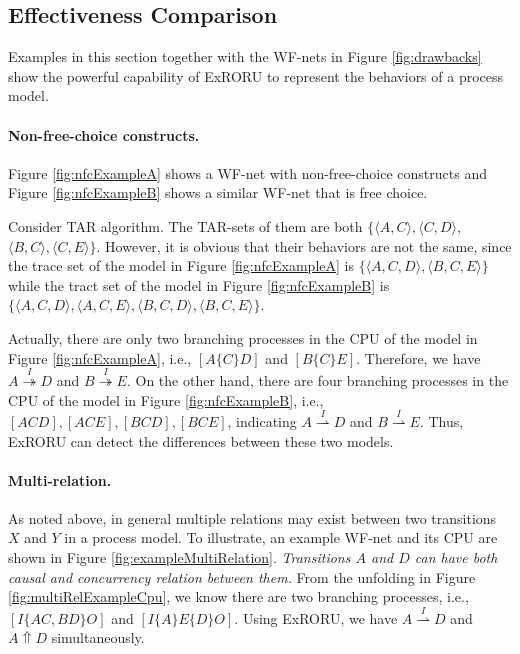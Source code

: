 \documentclass{llncs}
\begin{document}
\subsection{Effectiveness Comparison}\label{subsec:effectiveness}
Examples in this section together with the WF-nets in Figure \ref{fig:drawbacks} show the powerful capability of ExRORU to represent the behaviors of a process model.

\paragraph{\textbf{Non-free-choice constructs.}}\label{par:nfc} 
Figure \ref{fig:nfcExampleA} shows a WF-net with non-free-choice constructs \cite{de2003workflow} and Figure \ref{fig:nfcExampleB} shows a similar WF-net that is free choice.

Consider TAR algorithm. The TAR-sets of them are both $\{\langle A,C\rangle, \langle C,D\rangle$, $\langle B,C\rangle, \langle C,E\rangle\}$. However, it is obvious that their behaviors are not the same, since the trace set of the model in Figure \ref{fig:nfcExampleA} is $\{\langle A,C,D\rangle,\langle B,C,E\rangle\}$ while the tract set of the model in Figure \ref{fig:nfcExampleB} is $\{\langle A,C,D\rangle,\langle A,C,E\rangle,\langle B,C,D\rangle,\langle B,C,E\rangle\}$.

Actually, there are only two branching processes in the CPU of the model in Figure \ref{fig:nfcExampleA}, i.e., $[A\{C\}D]$ and $[B\{C\}E]$. Therefore, we have $A\overset{I}{\twoheadrightarrow}D$ and $B\overset{I}{\twoheadrightarrow}E$. On the other hand, there are four branching processes in the CPU of the model in Figure \ref{fig:nfcExampleB}, i.e., $[ACD],[ACE],[BCD],[BCE]$, indicating $A\overset{I}{\rightharpoonup}D$ and $B\overset{I}{\rightharpoonup}E$. Thus, ExRORU can detect the differences between these two models.

\paragraph{\textbf{Multi-relation.}} As noted above, in general multiple relations may exist between two transitions $X$ and $Y$ in a process model. To illustrate, an example WF-net and its CPU are shown in Figure \ref{fig:exampleMultiRelation}. \textit{Transitions $A$ and $D$ can have both causal and concurrency relation between them.} From the unfolding in Figure \ref{fig:multiRelExampleCpu}, we know there are two branching processes, i.e., $[I\{AC,BD\}O]$ and $[I\{A\}E\{D\}O]$. Using ExRORU, we have $A\overset{I}{\rightharpoonup}D$ and $A\Uparrow D$ simultaneously.
\end{document}
